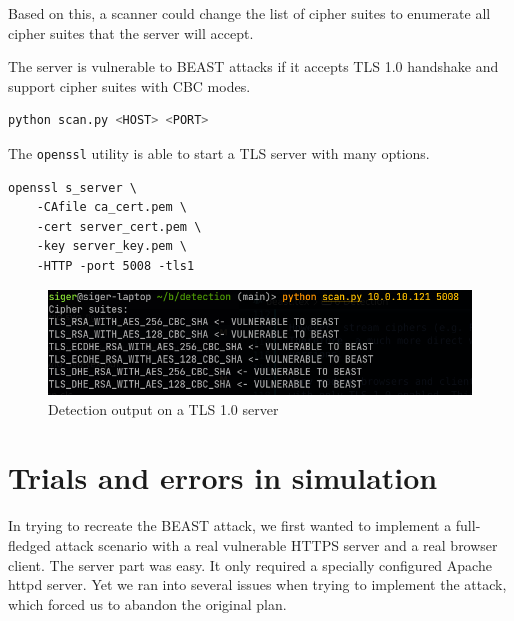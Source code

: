 \documentclass{acm_proc_article-sp}
\begin{document}
Based on this, a scanner could change the list of cipher suites to enumerate all
cipher suites that the server will accept.

The server is vulnerable to BEAST attacks if it accepts TLS 1.0 handshake and support
cipher suites with CBC modes.

\begin{lstlisting}[language=bash]
python scan.py <HOST> <PORT>
\end{lstlisting}

The \texttt{openssl} utility is able to start a TLS server with many options.

\begin{lstlisting}
openssl s_server \
    -CAfile ca_cert.pem \
    -cert server_cert.pem \
    -key server_key.pem \
    -HTTP -port 5008 -tls1
\end{lstlisting}

\begin{figure}[htb]
    \centering
    \includegraphics[keepaspectratio, width=\linewidth]{./figures/detection-output.png}
    \caption{Detection output on a TLS 1.0 server}
\end{figure}


%
%
\balancecolumns
\appendix
\section{Trials and errors in simulation}
In trying to recreate the BEAST attack, we first wanted to implement a full-fledged attack scenario
with a real vulnerable HTTPS server and a real browser client. The server part was easy. It only
required a specially configured Apache httpd server. Yet we ran into several issues when trying to
implement the attack, which forced us to abandon the original plan.
\end{document}
